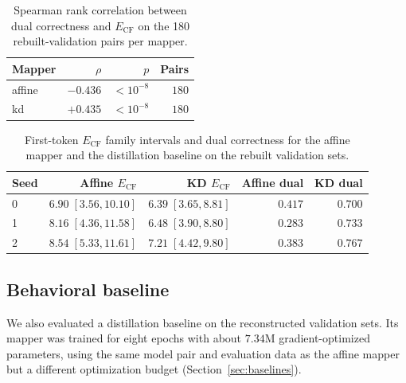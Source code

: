 \documentclass[11pt,a4paper]{article}
\begin{document}
\begin{table}[t]
\centering
\caption{Spearman rank correlation between dual correctness and
$E_{\mathrm{CF}}$ on the 180 rebuilt-validation pairs per mapper.}
\label{tab:rank}
\begin{tabular}{lrrr}
\toprule
Mapper & $\rho$ & $p$ & Pairs \\
\midrule
affine & $-0.436$ & $<10^{-8}$ & $180$ \\
kd & $+0.435$ & $<10^{-8}$ & $180$ \\
\bottomrule
\end{tabular}
\end{table}

\begin{table}[t]
\centering
\caption{First-token $E_{\mathrm{CF}}$ family intervals and dual correctness
for the affine mapper and the distillation baseline on the rebuilt validation
sets.}
\label{tab:mappergap}
\begin{tabular}{lrrrr}
\toprule
Seed & Affine $E_{\mathrm{CF}}$ & KD $E_{\mathrm{CF}}$ & Affine dual & KD dual \\
\midrule
0 & $6.90\;[3.56,10.10]$ & $6.39\;[3.65,8.81]$ & $0.417$ & $0.700$ \\
1 & $8.16\;[4.36,11.58]$ & $6.48\;[3.90,8.80]$ & $0.283$ & $0.733$ \\
2 & $8.54\;[5.33,11.61]$ & $7.21\;[4.42,9.80]$ & $0.383$ & $0.767$ \\
\bottomrule
\end{tabular}
\end{table}

\subsection{Behavioral baseline}
\label{sec:kdbase}

We also evaluated a distillation baseline on the reconstructed validation sets.
Its mapper was trained for eight epochs with about $7.34$M gradient-optimized
parameters, using the same model pair and evaluation data as the affine mapper
but a different optimization budget (Section~\ref{sec:baselines}).
\end{document}
